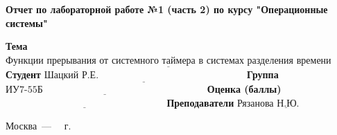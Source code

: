 \begin{titlepage}
    \begin{center}
        \Large\textbf{Отчет по лабораторной работе №1 (часть 2) по курсу "Операционные системы"}\newline
    \end{center}

    \noindent\textbf{Тема} $\underline{\text{Функции прерывания от системного таймера в системах разделения времени}}$\newline\newline\newline
    \noindent\textbf{Студент} $\underline{\text{Шацкий Р.Е.~~~~~~~~~~~~~~~~~~~~~~~~~~~~~~~~~~~~~~~~~~~~~}}$\newline\newline
    \noindent\textbf{Группа} $\underline{\text{ИУ7-55Б~~~~~~~~~~~~~~~~~~~~~~~~~~~~~~~~~~~~~~~~~~~~~~~~~~}}$\newline\newline
    \noindent\textbf{Оценка (баллы)} $\underline{\text{~~~~~~~~~~~~~~~~~~~~~~~~~~~~~~~~~~~~~~~~~~~~~~~~~}}$\newline\newline
    \noindent\textbf{Преподаватели} $\underline{\text{Рязанова Н.Ю.~~~~~~~~~~~}}$\newline

    \begin{center}
        \vfill
        Москва~---~\the\year
        ~г.
    \end{center}
    \restoregeometry
\end{titlepage}
